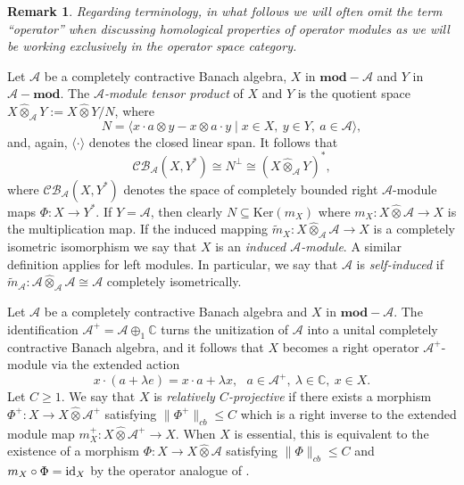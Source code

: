 \documentclass[preprint,12pt]{elsarticle}
\newtheorem{remark}[thm]{Remark}
\newcommand{\mc}[1]{\mathcal{#1}}
\newcommand{\e}[1]{\emph{#1}}
\newcommand{\la}{\langle}
\newcommand{\ra}{\rangle}
\newcommand{\lm}{\lambda}
\newcommand{\ten}{\otimes}
\newcommand{\hten}{\widehat{\otimes}}
\newcommand{\id}{\textnormal{id}}
\providecommand{\norm}[1]{\lVert#1\rVert}
\newcommand{\C}{\mathbb{C}}
\begin{document}

\begin{remark} Regarding terminology, in what follows we will often omit the term ``operator'' when discussing homological properties of operator modules as we will be working exclusively in the operator space category.
\end{remark}

Let $\mc{A}$ be a completely contractive Banach algebra, $X$ in $\mathbf{mod}-\mc{A}$ and $Y$ in $\mc{A}-\mathbf{mod}$. The \e{$\mc{A}$-module tensor product} of $X$ and $Y$ is the quotient space $X\hten_{\mc{A}}Y:=X\hten Y/N$, where
$$N=\la x\cdot a\ten y-x\ten a\cdot y\mid x\in X, \ y\in Y, \ a\in\mc{A}\ra,$$
and, again, $\la\cdot\ra$ denotes the closed linear span. It follows that
$$\mc{CB}_{\mc{A}}(X,Y^*)\cong N^{\perp}\cong(X\hten_{\mc{A}} Y)^*,$$
where $\mc{CB}_{\mc{A}}(X,Y^*)$ denotes the space of completely bounded right $\mc{A}$-module maps $\Phi:X\rightarrow Y^*$.
If $Y=\mc{A}$, then clearly $N\subseteq\mathrm{Ker}(m_X)$ where $m_X:X\hten\mc{A}\rightarrow X$ is the multiplication map. If the induced mapping $\widetilde{m}_X:X\hten_{\mc{A}}\mc{A}\rightarrow X$ is a completely isometric isomorphism we say that $X$ is an \e{induced $\mc{A}$-module}. A similar definition applies for left modules. In particular, we say that $\mc{A}$ is \e{self-induced} if $\widetilde{m}_\mc{A}:\mc{A}\hten_{\mc{A}}\mc{A}\cong\mc{A}$ completely isometrically.

Let $\mc{A}$ be a completely contractive Banach algebra and $X$ in $\mathbf{mod}-\mc{A}$. The identification $\mc{A}^+=\mc{A}\oplus_1\C$ turns the unitization of $\mc{A}$ into a unital completely contractive Banach algebra, and it follows that $X$ becomes a right operator $\mc{A}^+$-module via the extended action
\begin{equation*}x\cdot(a+\lm e)=x\cdot a+\lm x, \ \ \ a\in\mc{A}^+, \ \lm\in\C, \ x\in X.\end{equation*}
Let $C\geq1$. We say that $X$ is \e{relatively $C$-projective} if there exists a morphism $\Phi^+:X\rightarrow X\hten\mc{A}^+$ satisfying $\norm{\Phi^+}_{cb}\leq C$ which is a right inverse to the extended module map $m_X^+:X\hten\mc{A}^+\rightarrow X$. When $X$ is essential, this is equivalent to the existence of a morphism $\Phi:X\rightarrow X\hten\mc{A}$ satisfying $\norm{\Phi}_{cb}\leq C$ and $m_X\circ\Phi=\id_{X}$ by the operator analogue of \cite[Proposition 1.2]{DP}.
\end{document}
